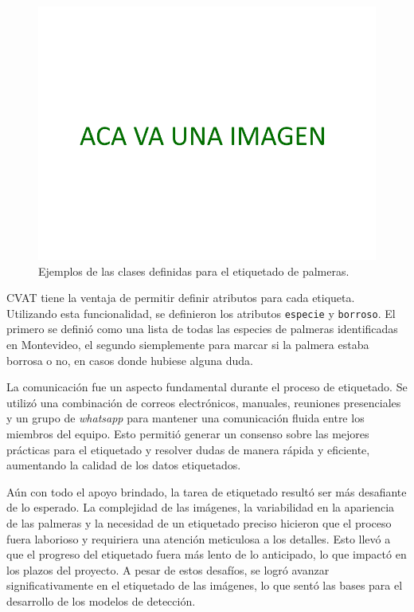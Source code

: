 \begin{figure}[H]
  \centering
  \includegraphics[scale=0.5]{./Figures/place-holder.png}
  \caption{Ejemplos de las clases definidas para el etiquetado de palmeras.}
  \label{fig:clases-palmeras}
\end{figure}

CVAT tiene la ventaja de permitir definir atributos para cada etiqueta. Utilizando esta funcionalidad, se definieron los atributos \lstinline[language=sh]|especie| y \lstinline[language=sh]|borroso|. El primero se definió como una lista de todas las especies de palmeras identificadas en Montevideo, el segundo siemplemente para marcar si la palmera estaba borrosa o no, en casos donde hubiese alguna duda.

La comunicación fue un aspecto fundamental durante el proceso de etiquetado. Se utilizó una combinación de correos electrónicos, manuales, reuniones presenciales y un grupo de \textit{whatsapp} para mantener una comunicación fluida entre los miembros del equipo. Esto permitió generar un consenso sobre las mejores prácticas para el etiquetado y resolver dudas de manera rápida y eficiente, aumentando la calidad de los datos etiquetados.

Aún con todo el apoyo brindado, la tarea de etiquetado resultó ser más desafiante de lo esperado. La complejidad de las imágenes, la variabilidad en la apariencia de las palmeras y la necesidad de un etiquetado preciso hicieron que el proceso fuera laborioso y requiriera una atención meticulosa a los detalles. Esto llevó a que el progreso del etiquetado fuera más lento de lo anticipado, lo que impactó en los plazos del proyecto. A pesar de estos desafíos, se logró avanzar significativamente en el etiquetado de las imágenes, lo que sentó las bases para el desarrollo de los modelos de detección.


